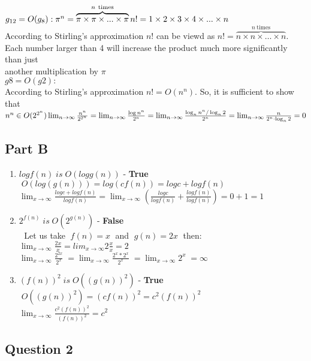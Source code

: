 \documentclass{article}
\begin{document}
$g_{12} = O(g_8):\\
\pi^{n} = \overbrace{\pi \times \pi \times ... \times \pi}^{n \mathrm
{\ times}}\\
n! = 1 \times 2 \times 3 \times 4 \times ... \times n$\\
According to Stirling's approximation $n!$ can be viewd as 
$n! = \overbrace{n \times n \times \ldots \times n}^{n \mathrm {\ times}} $.
Each number larger than 4 will increase the product much more significantly
than just\\ another multiplication by $\pi$\\

$g8 = O(g2):$\\
 According to Stirling's approximation $n! = O(n^n)$. So, it is
sufficient to show that $n^n \in O(2^{2^n})\\
\lim_{n\to\infty}\frac{n^n}{2^{2^n}} = 
\lim_{n\to\infty}\frac{\log n^n}{2^n} = 
\lim_{n\to\infty}\frac{\log_n n^n/\log_n2}{2^n} = 
\lim_{n\to\infty}\frac{n}{2^n\cdot\log_n2} = 0$\\
\clearpage
\subsection*{Part B}
\begin{enumerate}
  \item $log {f(n)} \; is \; O(log {g(n)})$ - \textbf{True}
    \\ $\; O(log(g(n))) = log {(cf(n))} = log c + log {f(n)}$
	\\ $\lim_{x\to\infty}\frac{log c + log {f(n)}}{log {f(n)}} =
	    \lim_{x\to\infty}(\frac{log c}{log {f(n)}} + \frac{log {f(n)}}{log
	    {f(n)}}) = 0 + 1 = 1$
  \item $2^{f(n)} \; is \; O(2^{g(n)})$ - \textbf{False}
    \\ $\; $ Let us take $\; f(n) = x \;$ and $\; g(n) = 2x \;$ then:
    \\ $\lim_{x\to\infty}\frac{2x}{x} = lim_{x\to\infty}2\frac{x}{x} = 2$
    \\ $\lim_{x\to\infty}\frac{2^{2x}}{2^x} \; =
        \lim_{x\to\infty}\frac{2^x*2^x}{2^x} \; =
        \lim_{x\to\infty}{2^x} \; = \infty$
  \item $(f(n))^2 \; is \; O((g(n))^2)$ - \textbf{True}
    \\ $\; O((g(n))^2) = (cf(n))^2 = c^2(f(n))^2$
    \\ $\lim_{x\to\infty}\frac{c^2(f(n))^2}{(f(n))^2} = c^2$
\end{enumerate}
\clearpage
\subsection*{Question 2}
\end{document}
